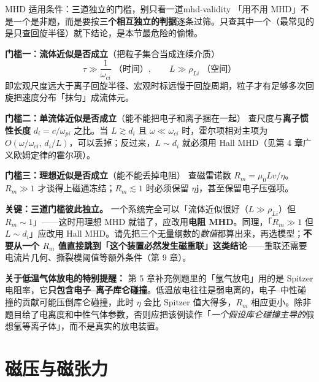 \documentclass[12pt,a4paper,openany,oneside]{book}
\newcommand{\diffmarktext}[1]{%
  \textcolor{coverMid!80}{\rule[-0.1em]{2pt}{0.9em}}\,%
  \textcolor{coverMid}{\footnotesize\textbf{[#1]}}%
}
\newcommand{\difficulty}[1]{\marginnote{\raggedright\diffmarktext{#1}}}
\newcommand{\vect}[1]{\bm{#1}}
\begin{document}
\begin{warning}{MHD 适用条件：三道独立的门槛，别只看一道}{mhd-validity}
「用不用 MHD」不是一个是非题，而是要按\textbf{三个相互独立的判据}逐条过筛。只查其中一个（最常见的是只查回旋半径）就下结论，是本节最危险的偷懒。

\textbf{门槛一：流体近似是否成立}（把粒子集合当成连续介质）
\[
\tau \gg \frac{1}{\omega_{ci}}\;\text{（时间）}, \qquad L \gg \rho_{Li}\;\text{（空间）}
\]
即宏观尺度远大于离子回旋半径、宏观时标远慢于回旋周期，粒子才有足够多次回旋把速度分布「抹匀」成流体元。

\textbf{门槛二：单流体近似是否成立}（能不能把电子和离子捆在一起）
查尺度与\textbf{离子惯性长度} $d_i=c/\omega_{pi}$ 之比。当 $L\gtrsim d_i$ 且 $\omega\ll\omega_{ci}$ 时，霍尔项相对主项为 $O(\omega/\omega_{ci},\,d_i/L)$，可以丢掉；反过来，$L\sim d_i$ 就必须用 Hall MHD（见第 4 章广义欧姆定律的霍尔项）。

\textbf{门槛三：理想近似是否成立}（能不能丢掉电阻）
查磁雷诺数 $R_m=\mu_0 Lv/\eta$。$R_m\gg1$ 才谈得上磁通冻结；$R_m\lesssim1$ 时必须保留 $\eta\vect{j}$，甚至保留电子压强项。

\textbf{关键：三道门槛彼此独立。} 一个系统完全可以「流体近似很好（$L\gg\rho_{Li}$）但 $R_m\sim1$」——这时用理想 MHD 就错了，应改用\textbf{电阻 MHD}。同理，「$R_m\gg1$ 但 $L\sim d_i$」应改用 Hall MHD。请先把三个无量纲数的\emph{数值}都算出来，再选模型；\textbf{不要从一个 $R_m$ 值直接跳到「这个装置必然发生磁重联」这类结论}——重联还需要电流片几何、撕裂模阈值等额外条件（第 9 章）。

\textbf{关于低温气体放电的特别提醒：} 第 5 章补充例题里的「氩气放电」用的是 Spitzer 电阻率，它\textbf{只包含电子--离子库仑碰撞}。低温放电往往是弱电离的，电子--中性碰撞的贡献可能压倒库仑碰撞，此时 $\eta$ 会比 Spitzer 值大得多，$R_m$ 相应更小。除非题目给了电离度和中性气体参数，否则应把该例读作「\emph{一个假设库仑碰撞主导的}假想氩等离子体」，而不是真实的放电装置。
\end{warning}

\section{磁压与磁张力}\difficulty{基础}
\label{sec:ch5-magpressure}
\end{document}
